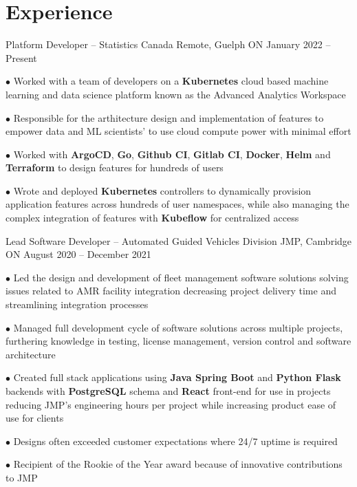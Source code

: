 \documentclass[a4paper,11pt]{article}
\newcommand{\sectionsep}{\vspace{-2.5mm}}
\begin{document}
\sectionsep
\section{Experience}
\resumeSubHeadingListStart

\resumeExp
{Platform Developer -- Statistics Canada}
{Remote, Guelph ON}
{January 2022 -- Present}
{}
\resumeItemListStart
\item[$\bullet$] Worked with a team of developers on a \textbf{Kubernetes} cloud based machine learning and data science
platform known as the Advanced Analytics Workspace
\href{https://analytics-platform.statcan.gc.ca/covid19}{\footnotesize{\faExternalLink}}
\item[$\bullet$] Responsible for the arthitecture design and implementation of features to  empower data and ML scientists' to
use cloud compute power with  minimal effort
\item[$\bullet$] Worked with \textbf{ArgoCD}, \textbf{Go}, \textbf{Github CI}, \textbf{Gitlab CI}, \textbf{Docker}, \textbf{Helm} and
\textbf{Terraform} to design features for hundreds of users
\item[$\bullet$] Wrote and deployed \textbf{Kubernetes} controllers to dynamically provision application
features across hundreds of user namespaces, while
also managing the complex integration of features with \textbf{Kubeflow} for centralized access
\resumeItemListEnd

\resumeExp
{Lead Software Developer -- Automated Guided Vehicles Division}
{JMP, Cambridge ON}
{August 2020 -- December 2021}
{}
\resumeItemListStart
\item[$\bullet$] Led the design and development of fleet management software solutions solving issues related to
AMR facility integration decreasing project delivery time and streamlining integration processes
\item[$\bullet$]  Managed full development cycle of software solutions across multiple projects, furthering
knowledge in testing, license management, version control and software architecture
\item[$\bullet$] Created full stack applications using \textbf{Java Spring Boot} and \textbf{Python Flask} backends with
\textbf{PostgreSQL} schema and \textbf{React} front-end for use in projects reducing JMP's engineering hours
per project while increasing product ease of use for clients
\item[$\bullet$] Designs often exceeded customer expectations where 24/7 uptime is required
\item[$\bullet$] Recipient of the Rookie of the Year award because of innovative contributions to JMP
\resumeItemListEnd
\end{document}
